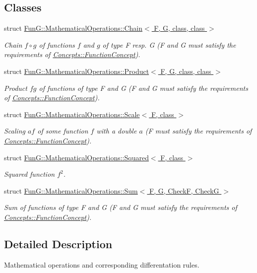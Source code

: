 \subsection*{Classes}
\begin{DoxyCompactItemize}
\item 
struct \hyperlink{structFunG_1_1MathematicalOperations_1_1Chain}{Fun\+G\+::\+Mathematical\+Operations\+::\+Chain$<$ F, G, class, class $>$}
\begin{DoxyCompactList}\small\item\em Chain $ f\circ g $ of functions $f$ and $g$ of type F resp. G (F and G must satisfy the requirements of \hyperlink{structFunG_1_1Concepts_1_1FunctionConcept}{Concepts\+::\+Function\+Concept}). \end{DoxyCompactList}\item 
struct \hyperlink{structFunG_1_1MathematicalOperations_1_1Product}{Fun\+G\+::\+Mathematical\+Operations\+::\+Product$<$ F, G, class, class $>$}
\begin{DoxyCompactList}\small\item\em Product $fg$ of functions of type F and G (F and G must satisfy the requirements of \hyperlink{structFunG_1_1Concepts_1_1FunctionConcept}{Concepts\+::\+Function\+Concept}). \end{DoxyCompactList}\item 
struct \hyperlink{structFunG_1_1MathematicalOperations_1_1Scale}{Fun\+G\+::\+Mathematical\+Operations\+::\+Scale$<$ F, class $>$}
\begin{DoxyCompactList}\small\item\em Scaling $ af $ of some function $ f $ with a double $ a $ (F must satisfy the requirements of \hyperlink{structFunG_1_1Concepts_1_1FunctionConcept}{Concepts\+::\+Function\+Concept}). \end{DoxyCompactList}\item 
struct \hyperlink{structFunG_1_1MathematicalOperations_1_1Squared}{Fun\+G\+::\+Mathematical\+Operations\+::\+Squared$<$ F, class $>$}
\begin{DoxyCompactList}\small\item\em Squared function $f^2$. \end{DoxyCompactList}\item 
struct \hyperlink{structFunG_1_1MathematicalOperations_1_1Sum}{Fun\+G\+::\+Mathematical\+Operations\+::\+Sum$<$ F, G, Check\+F, Check\+G $>$}
\begin{DoxyCompactList}\small\item\em Sum of functions of type F and G (F and G must satisfy the requirements of \hyperlink{structFunG_1_1Concepts_1_1FunctionConcept}{Concepts\+::\+Function\+Concept}). \end{DoxyCompactList}\end{DoxyCompactItemize}


\subsection{Detailed Description}
Mathematical operations and corresponding differentation rules. 

